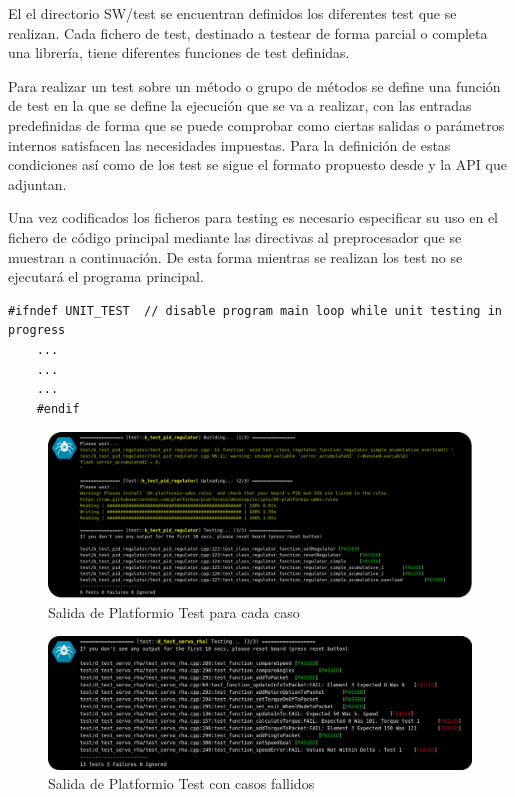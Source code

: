     El el directorio SW/test se encuentran definidos los diferentes test que se realizan. Cada fichero de test, destinado a testear de forma parcial o completa una librería, tiene diferentes funciones de test definidas.

    Para realizar un test sobre un método o grupo de métodos se define una función de test en la que se define la ejecución que se va a realizar, con las entradas predefinidas de forma que se puede comprobar como ciertas salidas o parámetros internos satisfacen las necesidades impuestas. Para la definición de estas condiciones así como de los test se sigue el formato propuesto desde  y la API que adjuntan.

    Una vez codificados los ficheros para testing es necesario especificar su uso en el fichero de código principal  mediante las directivas al preprocesador que se muestran a continuación. De esta forma mientras se realizan los test no se ejecutará el programa principal.

    \begin{lstlisting}[frame=single]
    #ifndef UNIT_TEST  // disable program main loop while unit testing in progress
    ...
    ...
    ...
    #endif
    \end{lstlisting}

    \begin{figure}[H]
       	\centering
       	\includegraphics[width=1\textwidth]{figuras/Imagenes_SW/test/SWTest_1.jpg}
       	\caption{Salida de Platformio Test para cada caso}
       	\label{fig:SW:test:standard_output}
    \end{figure}

    \begin{figure}[H]
       	\centering
       	\includegraphics[width=1\textwidth]{figuras/Imagenes_SW/test/SWTest_3.jpg}
       	\caption{Salida de Platformio Test con casos fallidos}
       	\label{fig:SW:test:error_output}
    \end{figure}

